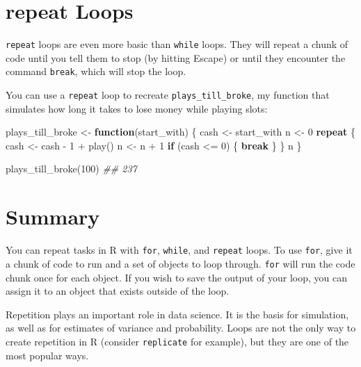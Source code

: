 \documentclass[
  letterpaper,
  DIV=11,
  numbers=noendperiod]{scrbook}
\newenvironment{Shaded}{\begin{snugshade}}{\end{snugshade}}
\newcommand{\ControlFlowTok}[1]{\textcolor[rgb]{0.00,0.23,0.31}{\textbf{#1}}}
\newcommand{\DecValTok}[1]{\textcolor[rgb]{0.68,0.00,0.00}{#1}}
\newcommand{\DocumentationTok}[1]{\textcolor[rgb]{0.37,0.37,0.37}{\textit{#1}}}
\newcommand{\FunctionTok}[1]{\textcolor[rgb]{0.28,0.35,0.67}{#1}}
\newcommand{\NormalTok}[1]{\textcolor[rgb]{0.00,0.23,0.31}{#1}}
\newcommand{\OtherTok}[1]{\textcolor[rgb]{0.00,0.23,0.31}{#1}}
\newcommand{\SpecialCharTok}[1]{\textcolor[rgb]{0.37,0.37,0.37}{#1}}
\begin{document}
\section{repeat Loops}\label{repeat-loops}

\texttt{repeat} loops are even more basic than \texttt{while} loops.
They will repeat a chunk of code until you tell them to stop (by hitting
Escape) or until they encounter the command \texttt{break}, which will
stop the loop.

You can use a \texttt{repeat} loop to recreate
\texttt{plays\_till\_broke}, my function that simulates how long it
takes to lose money while playing slots:

\begin{Shaded}
\begin{Highlighting}[]
\NormalTok{plays\_till\_broke }\OtherTok{\textless{}{-}} \ControlFlowTok{function}\NormalTok{(start\_with) \{}
\NormalTok{  cash }\OtherTok{\textless{}{-}}\NormalTok{ start\_with}
\NormalTok{  n }\OtherTok{\textless{}{-}} \DecValTok{0}
  \ControlFlowTok{repeat}\NormalTok{ \{}
\NormalTok{    cash }\OtherTok{\textless{}{-}}\NormalTok{ cash }\SpecialCharTok{{-}} \DecValTok{1} \SpecialCharTok{+} \FunctionTok{play}\NormalTok{()}
\NormalTok{    n }\OtherTok{\textless{}{-}}\NormalTok{ n }\SpecialCharTok{+} \DecValTok{1}
    \ControlFlowTok{if}\NormalTok{ (cash }\SpecialCharTok{\textless{}=} \DecValTok{0}\NormalTok{) \{}
      \ControlFlowTok{break}
\NormalTok{    \}}
\NormalTok{  \}}
\NormalTok{  n}
\NormalTok{\}}

\FunctionTok{plays\_till\_broke}\NormalTok{(}\DecValTok{100}\NormalTok{)}
\DocumentationTok{\#\# 237}
\end{Highlighting}
\end{Shaded}

\section{Summary}\label{summary-8}

You can repeat tasks in R with \texttt{for}, \texttt{while}, and
\texttt{repeat} loops. To use \texttt{for}, give it a chunk of code to
run and a set of objects to loop through. \texttt{for} will run the code
chunk once for each object. If you wish to save the output of your loop,
you can assign it to an object that exists outside of the loop.

Repetition plays an important role in data science. It is the basis for
simulation, as well as for estimates of variance and probability. Loops
are not the only way to create repetition in R (consider
\texttt{replicate} for example), but they are one of the most popular
ways.
\end{document}
